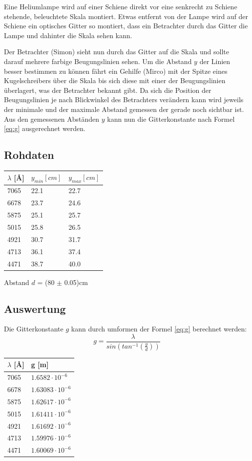 \documentclass[12pt,a4paper]{article}
\begin{document}
Eine Heliumlampe wird auf einer Schiene direkt vor eine senkrecht zu Schiene stehende, beleuchtete Skala montiert. Etwas entfernt von der Lampe wird auf der Schiene ein optisches Gitter so montiert, dass ein Betrachter durch das Gitter die Lampe und dahinter die Skala sehen kann.

Der Betrachter (Simon) sieht nun durch das Gitter auf die Skala und sollte darauf mehrere farbige Beugungslinien sehen. Um die Abstand $y$ der Linien besser bestimmen zu k\"onnen f\"ahrt ein Gehilfe (Mirco) mit der Spitze eines Kugelschreibers \"uber die Skala bis sich diese mit einer der Beugungslinien \"uberlagert, was der Betrachter bekannt gibt. Da sich die Position der Beugungslinien je nach Blickwinkel des Betrachters ver\"andern kann wird jeweils der minimale und der maximale Abstand gemessen der gerade noch sichtbar ist. Aus den gemessenen Abst\"anden $y$ kann nun die Gitterkonstante nach Formel \ref{eq:g} ausgerechnet werden.

\subsection*{Rohdaten}
\begin{tabular}{|l|l|l|}
\hline
$\lambda$ [\AA]&$y_{min} [cm]$&$y_{max} [cm]$\\
\hline
7065&22.1&22.7\\
6678&23.7&24.6\\
5875&25.1&25.7\\
5015&25.8&26.5\\
4921&30.7&31.7\\
4713&36.1&37.4\\
4471&38.7&40.0\\
\hline
\end{tabular}\vspace{10pt}

Abstand $d$ = (80 $\pm$ 0.05)cm

\subsection*{Auswertung}
Die Gitterkonstante $g$ kann durch umformen der Formel \ref{eq:g} berechnet werden:
\[ g = \frac{\lambda}{sin(tan^{-1}(\frac{y}{d}))} \]

\begin{tabular}{|l|l|}
\hline
$\lambda$ [\AA]&g [m]\\
\hline
7065&$1.6582\cdot 10^{-6}$\\
6678&$1.63083\cdot 10^{-6}$\\
5875&$1.62617\cdot 10^{-6}$\\
5015&$1.61411\cdot 10^{-6}$\\
4921&$1.61692\cdot 10^{-6}$\\
4713&$1.59976\cdot 10^{-6}$\\
4471&$1.60069\cdot 10^{-6}$\\
\hline
\end{tabular}\vspace{10pt}
\end{document}
